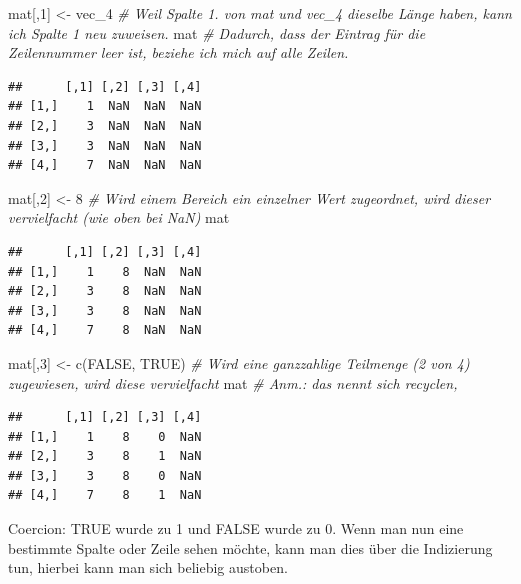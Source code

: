 \documentclass[
]{book}
\newenvironment{Shaded}{\begin{snugshade}}{\end{snugshade}}
\newcommand{\CommentTok}[1]{\textcolor[rgb]{0.56,0.35,0.01}{\textit{#1}}}
\newcommand{\ConstantTok}[1]{\textcolor[rgb]{0.00,0.00,0.00}{#1}}
\newcommand{\DecValTok}[1]{\textcolor[rgb]{0.00,0.00,0.81}{#1}}
\newcommand{\FunctionTok}[1]{\textcolor[rgb]{0.00,0.00,0.00}{#1}}
\newcommand{\NormalTok}[1]{#1}
\newcommand{\OtherTok}[1]{\textcolor[rgb]{0.56,0.35,0.01}{#1}}
\theoremstyle{definition}
\theoremstyle{definition}
\theoremstyle{definition}
\theoremstyle{definition}
\theoremstyle{remark}
\begin{document}
\begin{Shaded}
\begin{Highlighting}[]
\NormalTok{mat[,}\DecValTok{1}\NormalTok{] }\OtherTok{\textless{}{-}}\NormalTok{ vec\_4 }\CommentTok{\# Weil Spalte 1. von mat und vec\_4 dieselbe Länge haben, kann ich Spalte 1 neu zuweisen. }
\NormalTok{mat              }\CommentTok{\# Dadurch, dass der Eintrag für die Zeilennummer leer ist, beziehe ich mich auf alle Zeilen.}
\end{Highlighting}
\end{Shaded}

\begin{verbatim}
##      [,1] [,2] [,3] [,4]
## [1,]    1  NaN  NaN  NaN
## [2,]    3  NaN  NaN  NaN
## [3,]    3  NaN  NaN  NaN
## [4,]    7  NaN  NaN  NaN
\end{verbatim}

\begin{Shaded}
\begin{Highlighting}[]
\NormalTok{mat[,}\DecValTok{2}\NormalTok{] }\OtherTok{\textless{}{-}} \DecValTok{8}  \CommentTok{\# Wird einem Bereich ein einzelner Wert zugeordnet, wird dieser vervielfacht (wie oben bei NaN)}
\NormalTok{mat}
\end{Highlighting}
\end{Shaded}

\begin{verbatim}
##      [,1] [,2] [,3] [,4]
## [1,]    1    8  NaN  NaN
## [2,]    3    8  NaN  NaN
## [3,]    3    8  NaN  NaN
## [4,]    7    8  NaN  NaN
\end{verbatim}

\begin{Shaded}
\begin{Highlighting}[]
\NormalTok{mat[,}\DecValTok{3}\NormalTok{] }\OtherTok{\textless{}{-}} \FunctionTok{c}\NormalTok{(}\ConstantTok{FALSE}\NormalTok{, }\ConstantTok{TRUE}\NormalTok{) }\CommentTok{\# Wird eine ganzzahlige Teilmenge (2 von 4) zugewiesen, wird diese vervielfacht}
\NormalTok{mat                       }\CommentTok{\# Anm.: das nennt sich recyclen,}
\end{Highlighting}
\end{Shaded}

\begin{verbatim}
##      [,1] [,2] [,3] [,4]
## [1,]    1    8    0  NaN
## [2,]    3    8    1  NaN
## [3,]    3    8    0  NaN
## [4,]    7    8    1  NaN
\end{verbatim}

Coercion: TRUE wurde zu 1 und FALSE wurde zu 0. Wenn man nun eine
bestimmte Spalte oder Zeile sehen möchte, kann man dies über die
Indizierung tun, hierbei kann man sich beliebig austoben.
\end{document}
